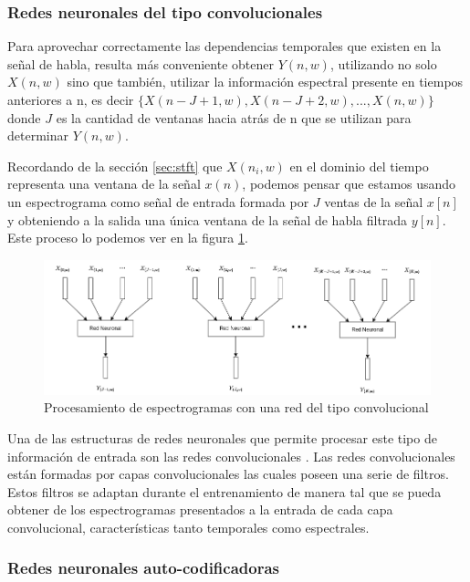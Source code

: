 \subsubsection{Redes neuronales del tipo convolucionales}
\label{sec:redes_convolucionales}

Para aprovechar correctamente las dependencias temporales que existen en la señal de habla, resulta más conveniente obtener $Y(n, w)$, utilizando no solo $X(n,w)$ sino que también, utilizar la información espectral presente en tiempos anteriores a n, es decir $\{ X(n-J+1,w), X(n-J+2,w), ... , X(n,w) \}$ donde $J$ es la cantidad de ventanas hacia atrás de n que se utilizan para determinar $Y(n, w)$.

Recordando de la sección \ref{sec:stft} que $X(n_i,w)$ en el dominio del tiempo representa una ventana de la señal $x(n)$,  podemos pensar que estamos usando un espectrograma como señal de entrada formada por $J$ ventas de la señal $x[n]$ y obteniendo a la salida una única ventana de la señal de habla filtrada $y[n]$. Este proceso lo podemos ver en la figura \ref{fig:ch3_features_cnn}.

\begin{figure}
	\centering
	\centerline{\includegraphics[scale=0.5]{images/ch3/features-cnn.png}}
	\caption{Procesamiento de espectrogramas con una red del tipo convolucional}
	\label{fig:ch3_features_cnn}
\end{figure}

Una de las estructuras de redes neuronales que permite procesar este tipo de información de entrada son las redes convolucionales \cite{deep_learning}. Las redes convolucionales están formadas por capas convolucionales las cuales poseen una serie de filtros. Estos filtros se adaptan durante el entrenamiento de manera tal que se pueda obtener de los espectrogramas presentados a la entrada de cada capa convolucional, características tanto temporales como espectrales.

\subsubsection{Redes neuronales auto-codificadoras}

